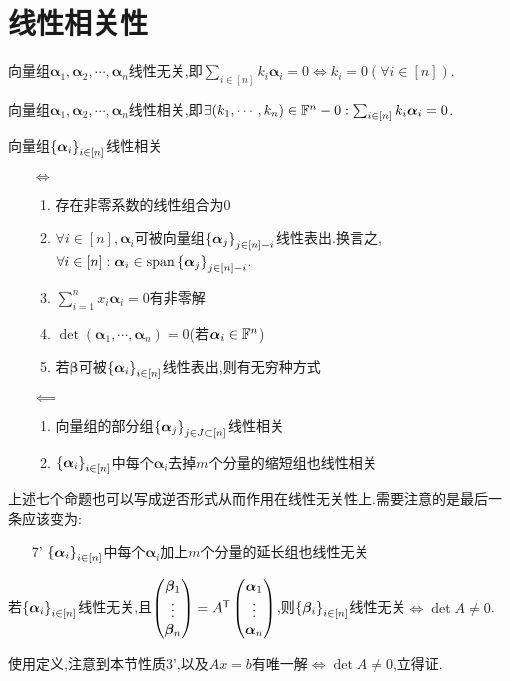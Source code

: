 \documentclass[openany]{book}
\begin{document}
\section{线性相关性}
\begin{definition}
    向量组$\bm{\alpha}_1,\bm{\alpha}_2,\cdots,\bm{\alpha}_n$线性无关,即$\sum_{i\in [n]}k_i\bm{\alpha}_i=0\iff k_i=0(\forall i\in [n])$.

    向量组$\bm{\alpha}_1,\bm{\alpha}_2,\cdots,\bm{\alpha}_n$线性相关,即$\exists (k_1,\cdots,k_n)\in\mathbb{F}^n-0:\sum_{i\in [n]}k_i\bm{\alpha}_i=0$.
\end{definition}
向量组$\left\{\bm{\alpha}_i\right\}_{i\in[n]}$线性相关\begin{itemize}
    \item[$\iff$] \begin{enumerate}
        \item 存在非零系数的线性组合为0
        \item $\forall i\in [n], \bm{\alpha}_i$可被向量组$\left\{\bm{\alpha}_j\right\}_{j\in[n]-i}$线性表出.换言之,$\forall i\in [n]:\bm{\alpha}_i\in \mathrm{span}\left\{\bm{\alpha}_j\right\}_{j\in [n]-i}$.
        \item $\sum_{i=1}^n x_i\bm{\alpha}_i=0$有非零解
        \item $\det(\bm{\alpha}_1,\cdots,\bm{\alpha}_n)=0$(若$\bm{\alpha}_i\in \mathbb{F}^n$)
        \item 若$\bm{\beta}$可被$\left\{\bm{\alpha}_i\right\}_{i\in[n]}$线性表出,则有无穷种方式
    \end{enumerate}
    \item[$\impliedby$] \begin{enumerate}[resume]
        \item 向量组的部分组$\left\{\bm{\alpha}_j\right\}_{j\in J\subset [n]}$线性相关
        \item $\left\{\bm{\alpha}_i\right\}_{i\in[n]}$中每个$\bm{\alpha}_i$去掉$m$个分量的缩短组也线性相关
    \end{enumerate}
\end{itemize}
上述七个命题也可以写成逆否形式从而作用在线性无关性上.需要注意的是最后一条应该变为:\begin{enumerate}
    \item[7'] $\left\{\bm{\alpha}_i\right\}_{i\in[n]}$中每个$\bm{\alpha}_i$加上$m$个分量的延长组也线性无关
\end{enumerate}

\begin{proposition}
    若$\left\{\bm{\alpha}_i\right\}_{i\in[n]}$线性无关,且$\begin{pmatrix}
        \bm{\beta}_1\\\vdots\\\bm{\beta}_n
    \end{pmatrix}=A^{\mathsf{T}}\begin{pmatrix}
        \bm{\alpha}_1\\\vdots\\\bm{\alpha}_n
    \end{pmatrix}$,则$\left\{\bm{\beta}_i\right\}_{i\in[n]}$线性无关$\iff \det A\neq 0$.
\end{proposition}
使用定义,注意到本节性质3',以及$Ax=b$有唯一解$\iff \det A\neq 0$,立得证.
\end{document}
